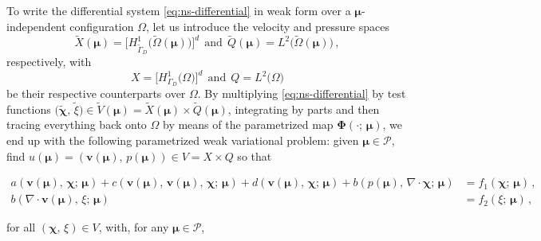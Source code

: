 \documentclass[longtitle]{elsarticle}
\numberwithin{equation}{section}
\theoremstyle{theorem}
\theoremstyle{definition}
\theoremstyle{remark}
\theoremstyle{proposition}
\numberwithin{figure}{section}
\newcommand{\wt}[1]{\widetilde{#1}}
\newcommand{\bg}[1]{\boldsymbol{#1}}
\begin{document}
		To write the differential system \eqref{eq:ns-differential} in weak form over a $\bg{\mu}$-independent configuration $\Omega$, let us introduce the velocity and pressure spaces \[ \wt{X}(\bg{\mu}) = \big[ H^1_{\wt{\Gamma}_D} \big( \wt{\Omega}(\bg{\mu}) \big) \big]^d ~~ \text{and} ~~ \wt{Q}(\bg{\mu}) = L^2 \big( \wt{\Omega}(\bg{\mu}) \big) \, , \] respectively, with \[ X = \big[ H^1_{\Gamma_D} \big( \Omega \big) \big]^d ~~ \text{and} ~~ Q = L^2 \big( \Omega \big) \] be their respective counterparts over $\Omega$. By multiplying \eqref{eq:ns-differential} by test functions $\big( \wt{\bg{\chi}}, \, \wt{\xi} \big) \in \wt{V}(\bg{\mu}) = \wt{X}(\bg{\mu}) \times \wt{Q}(\bg{\mu})$, integrating by parts and then tracing everything back onto $\Omega$ by means of the parametrized map $\bg{\Phi}(\cdot; \, \bg{\mu})$, we end up with the following parametrized weak variational problem: given $\bg{\mu} \in \mathcal{P}$, find $u(\bg{\mu}) = (\bg{v}(\bg{\mu}), \, p(\bg{\mu})) \in V = X \times Q$ so that
		\vspace*{-0.1cm}
		\begin{linenomath}\begin{equation*}
			\begin{aligned}
				a(\bg{v}(\bg{\mu}), \, \bg{\chi}; \, \bg{\mu}) + c(\bg{v}(\bg{\mu}), \, \bg{v}(\bg{\mu}), \, \bg{\chi}; \, \bg{\mu}) + d(\bg{v}(\bg{\mu}), \, \bg{\chi}; \, \bg{\mu}) + b(p(\bg{\mu}), \, \nabla \cdot \bg{\chi}; \, \bg{\mu}) & = f_1(\bg{\chi}; \, \bg{\mu}) \, , \\
				b(\nabla \cdot \bg{v}(\bg{\mu}), \, \xi; \, \bg{\mu}) & = f_2(\xi; \, \bg{\mu}) \, ,
			\end{aligned}
		\end{equation*}\end{linenomath}
		for all $(\bg{\chi}, \, \xi) \in V$, with, for any $\bg{\mu} \in \mathcal{P}$,	
		\vspace*{-0.1cm}	
\end{document}
